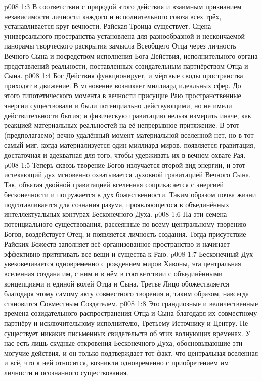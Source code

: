 \vs p008 1:3 В соответствии с природой этого действия и взаимным признанием независимости личности каждого и исполнительного союза всех трёх, устанавливается круг вечности. Райская Троица существует. Сцена универсального пространства установлена для разнообразной и нескончаемой панорамы творческого раскрытия замысла Всеобщего Отца через личность Вечного Сына и посредством исполнения Бога Действия, исполнительного органа представлений реальности, поставленных созидательным партнёрством Отца и Сына.
\vs p008 1:4 \pc Бог Действия функционирует, и мёртвые своды пространства приходят в движение. В мгновение возникает миллиард идеальных сфер. До этого гипотетического момента в вечности присущие Раю пространственные энергии существовали и были потенциально действующими, но не имели действительности бытия; и физическую гравитацию нельзя измерить иначе, как реакцией материальных реальностей на её непрерывное притяжение. В этот (предполагаемо) вечно удалённый момент материальной вселенной нет, но в тот самый миг, когда материализуется один миллиард миров, появляется гравитация, достаточная и адекватная для того, чтобы удерживать их в вечном охвате Рая.
\vs p008 1:5 Теперь сквозь творение Богов излучается второй вид энергии, и этот истекающий дух мгновенно охватывается духовной гравитацией Вечного Сына. Так, объятая двойной гравитацией вселенная соприкасается с энергией бесконечности и погружается в дух божественности. Таким образом почва жизни подготавливается для сознания разума, проявляющегося в объединённых интеллектуальных контурах Бесконечного Духа.
\vs p008 1:6 На эти семена потенциального существования, рассеянные по всему центральному творению Богов, воздействует Отец, и появляется личность создания. Тогда присутствие Райских Божеств заполняет всё организованное пространство и начинает эффективно притягивать все вещи и существа к Раю.
\vs p008 1:7 \pc Бесконечный Дух увековечивается одновременно с рождением миров Хавоны, эта центральная вселенная создана им, с ним и в нём в соответствии с объединёнными концепциями и единой волей Отца и Сына. Третье Лицо обожествляется благодаря этому самому акту совместного творения и, таким образом, навсегда становится Совместным Создателем.
\vs p008 1:8 \pc Это грандиозные и величественные времена созидательного распространения Отца и Сына благодаря их совместному партнёру и исключительному исполнителю, Третьему Источнику и Центру. Не существует никаких письменных свидетельств об этих волнующих временах. У нас есть лишь скудные откровения Бесконечного Духа, обосновывающие эти могучие действия, и он только подтверждает тот факт, что центральная вселенная и всё, что к ней относится, возникли одновременно с приобретением им личности и осознанного существования.
